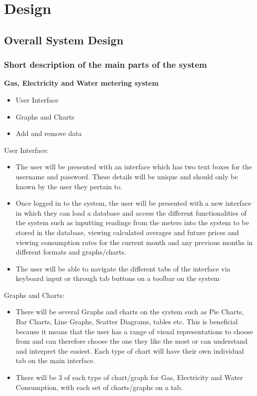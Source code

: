 \chapter{Design}

\section{Overall System Design}

\subsection{Short description of the main parts of the system}
\textbf{Gas, Electricity and Water metering system}
\begin{itemize}
\item{User Interface}
\item{Graphs and Charts}
\item{Add and remove data}
\end{itemize}
User Interface:
\begin{itemize}
\item{The user will be presented with an interface which has two text boxes for the username and password. These details will be unique and should only be known by the user they pertain to.}
\item{Once logged in to the system, the user will be presented with a new interface in which they can load a database and access the different functionalities of the system such as inputting readings from the meters into the system to be stored in the database, viewing calculated averages and future prices and viewing consumption rates for the current month and any previous months in different formats and graphs/charts.}
\item{The user will be able to navigate the different tabs of the interface via keyboard input or through tab buttons on a toolbar on the system}
\end{itemize}

Graphs and Charts:
\begin{itemize}
\item{There will be several Graphs and charts on the system such as Pie Charts, Bar Charts, Line Graphs, Scatter Diagrams, tables etc. This is beneficial because it means that the user has a range of visual representations to choose from and can therefore choose the one they like the most or can understand and interpret the easiest. Each type of chart will have their own individual tab on the main interface.}
\item{There will be 3 of each type of chart/graph for Gas, Electricity and Water Consumption, with each set of charts/graphs on a tab.}
\end{itemize}

